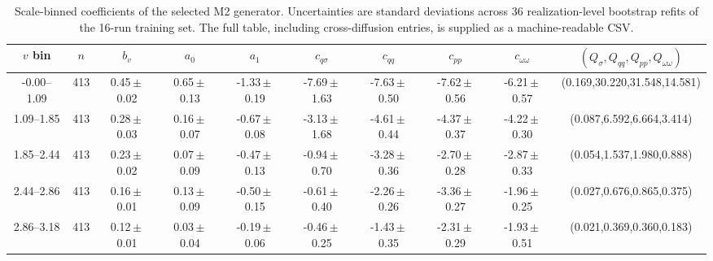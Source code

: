 \begin{table}[t]
\caption{Scale-binned coefficients of the selected M2 generator. Uncertainties are standard deviations across 36 realization-level bootstrap refits of the 16-run training set. The full table, including cross-diffusion entries, is supplied as a machine-readable CSV.}
\label{tab:m2-coefficients}
\centering\scriptsize
\begin{tabular}{c c c c c c c c c c}
\hline\hline
$v$ bin & $n$ & $b_v$ & $a_0$ & $a_1$ & $c_{q\sigma}$ & $c_{qq}$ & $c_{pp}$ & $c_{\omega\omega}$ & $(Q_\sigma,Q_{qq},Q_{pp},Q_{\omega\omega})$\\
\hline
-0.00--1.09 & 413 & 0.45\,$\pm$\,0.02 & 0.65\,$\pm$\,0.13 & -1.33\,$\pm$\,0.19 & -7.69\,$\pm$\,1.63 & -7.63\,$\pm$\,0.50 & -7.62\,$\pm$\,0.56 & -6.21\,$\pm$\,0.57 & (0.169,30.220,31.548,14.581)\\
1.09--1.85 & 413 & 0.28\,$\pm$\,0.03 & 0.16\,$\pm$\,0.07 & -0.67\,$\pm$\,0.08 & -3.13\,$\pm$\,1.68 & -4.61\,$\pm$\,0.44 & -4.37\,$\pm$\,0.37 & -4.22\,$\pm$\,0.30 & (0.087,6.592,6.664,3.414)\\
1.85--2.44 & 413 & 0.23\,$\pm$\,0.02 & 0.07\,$\pm$\,0.09 & -0.47\,$\pm$\,0.13 & -0.94\,$\pm$\,0.70 & -3.28\,$\pm$\,0.36 & -2.70\,$\pm$\,0.28 & -2.87\,$\pm$\,0.33 & (0.054,1.537,1.980,0.888)\\
2.44--2.86 & 413 & 0.16\,$\pm$\,0.01 & 0.13\,$\pm$\,0.09 & -0.50\,$\pm$\,0.15 & -0.61\,$\pm$\,0.40 & -2.26\,$\pm$\,0.26 & -3.36\,$\pm$\,0.27 & -1.96\,$\pm$\,0.25 & (0.027,0.676,0.865,0.375)\\
2.86--3.18 & 413 & 0.12\,$\pm$\,0.01 & 0.03\,$\pm$\,0.04 & -0.19\,$\pm$\,0.06 & -0.46\,$\pm$\,0.25 & -1.43\,$\pm$\,0.35 & -2.31\,$\pm$\,0.29 & -1.93\,$\pm$\,0.51 & (0.021,0.369,0.360,0.183)\\
\hline\hline
\end{tabular}
\end{table}